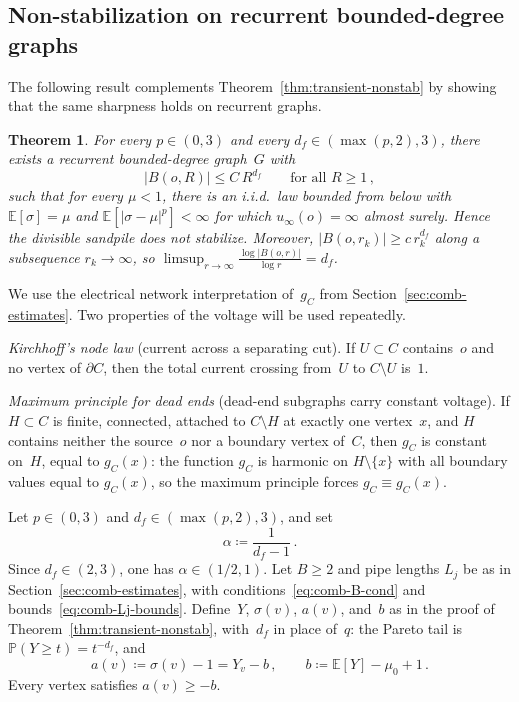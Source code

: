 \documentclass[aop]{imsart}
\theoremstyle{plain}
\newtheorem{theorem}{Theorem}[section]
\theoremstyle{definition}
\newcommand{\E}{\mathbb{E}}
\renewcommand{\P}{\mathbb{P}}
\begin{document}
	
	\subsection{Non-stabilization on recurrent bounded-degree graphs}\label{sec:recurrent-nonstab}
	
	The following result complements Theorem~\ref{thm:transient-nonstab} by showing that the same sharpness holds on recurrent graphs.
	
	\begin{theorem}\label{thm:recurrent-nonstab}
		For every $p\in(0,3)$ and every $d_f\in(\max(p,2),3)$, there exists a recurrent bounded-degree graph~$G$ with
		\begin{equation}
			|B(o,R)|\leq C\,R^{d_f}
			\qquad\text{for all } R\geq 1\,,
		\end{equation}
		such that for every $\mu<1$, there is an i.i.d.\ law bounded from below with $\E[\sigma]=\mu$ and $\E[|\sigma-\mu|^p]<\infty$ for which $u_\infty(o)=\infty$ almost surely. Hence the divisible sandpile does not stabilize.
		Moreover, $|B(o,r_k)|\geq c\,r_k^{d_f}$ along a subsequence $r_k\to\infty$, so $\limsup_{r\to\infty}\frac{\log|B(o,r)|}{\log r}=d_f$.
	\end{theorem}
	
	We use the electrical network interpretation of~$g_C$ from Section~\ref{sec:comb-estimates}.  Two properties of the voltage will be used repeatedly.
	
	\emph{Kirchhoff's node law} (current across a separating cut).  If $U\subset C$ contains~$o$ and no vertex of $\partial C$, then the total current crossing from~$U$ to $C\setminus U$ is~$1$.
	
	\emph{Maximum principle for dead ends} (dead-end subgraphs carry constant voltage).  If $H\subset C$ is finite, connected, attached to $C\setminus H$ at exactly one vertex~$x$, and $H$ contains neither the source~$o$ nor a boundary vertex of~$C$, then $g_C$ is constant on~$H$, equal to $g_C(x)$: the function $g_C$ is harmonic on $H\setminus\{x\}$ with all boundary values equal to $g_C(x)$, so the maximum principle \citep[Section~2.1]{LP16} forces $g_C\equiv g_C(x)$.
	
	Let $p\in(0,3)$ and $d_f\in(\max(p,2),3)$, and set
	\begin{equation}
		\alpha\coloneqq\frac{1}{d_f-1}\,.
	\end{equation}
	Since $d_f\in(2,3)$, one has $\alpha\in(1/2,1)$.  Let $B\geq 2$ and pipe lengths $L_j$ be as in Section~\ref{sec:comb-estimates}, with conditions~\eqref{eq:comb-B-cond} and bounds~\eqref{eq:comb-Lj-bounds}.
	Define~$Y$, $\sigma(v)$, $a(v)$, and~$b$ as in the proof of Theorem~\ref{thm:transient-nonstab}, with~$d_f$ in place of~$q$: the Pareto tail is~$\P(Y\geq t)=t^{-d_f}$, and
	\begin{equation}\label{eq:rec-ab}
		a(v)\coloneqq\sigma(v)-1=Y_v-b\,,
		\qquad
		b\coloneqq\E[Y]-\mu_0+1\,.
	\end{equation}
	Every vertex satisfies $a(v)\geq -b$.
	
\end{document}
